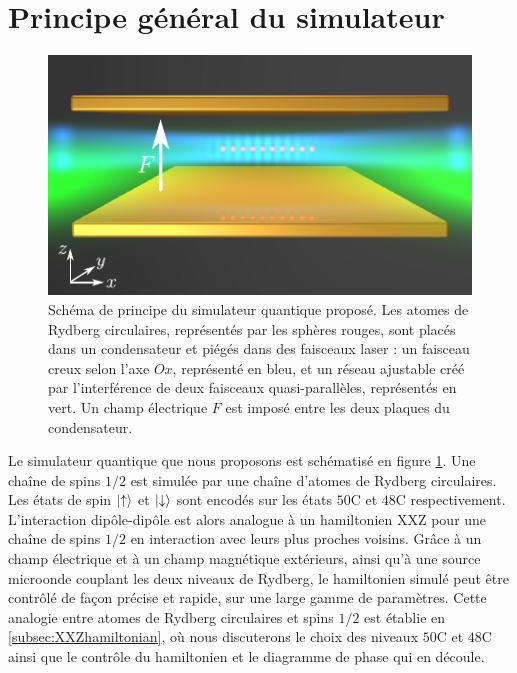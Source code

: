 \section{Principe général du simulateur}
%
\begin{figure}[h]
\centering
\includegraphics[width=.8\linewidth]{figures/circsim/scheme_simulator}
\caption[Schéma de principe du simulateur quantique]
{Schéma de principe du simulateur quantique proposé.
Les atomes de Rydberg circulaires, représentés par les sphères rouges, sont placés dans un condensateur et piégés dans des faisceaux laser : un faisceau \og creux \fg{} selon l'axe $Ox$, représenté en bleu, et un réseau ajustable créé par l'interférence de deux faisceaux quasi-parallèles, représentés en vert.
Un champ électrique $F$ est imposé entre les deux plaques du condensateur.
}
\label{fig:scheme_simul}
\end{figure}
%
\noindent Le simulateur quantique que nous proposons est schématisé en figure \ref{fig:scheme_simul}.
Une chaîne de spins $1/2$ est simulée par une chaîne d'atomes de Rydberg circulaires.
Les états de spin $\ket{\uparrow}$ et $\ket{\downarrow}$ sont encodés sur les états $\mathrm{50C}$ et $\mathrm{48C}$ respectivement.
L'interaction dipôle-dipôle est alors analogue à un hamiltonien XXZ pour une chaîne de spins $1/2$ en interaction avec leurs plus proches voisins.
Grâce à un champ électrique et à un champ magnétique extérieurs, ainsi qu'à une source microonde couplant les deux niveaux de Rydberg, le hamiltonien simulé peut être contrôlé de façon précise et rapide, sur une large gamme de paramètres.
Cette analogie entre atomes de Rydberg circulaires et spins $1/2$ est établie en \ref{subsec:XXZhamiltonian}, où nous discuterons le choix des niveaux $\mathrm{50C}$ et $\mathrm{48C}$ ainsi que le contrôle du hamiltonien et le diagramme de phase qui en découle.

